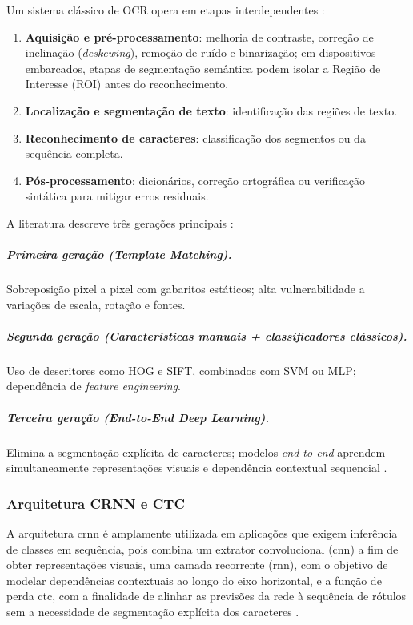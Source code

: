 Um sistema clássico de OCR opera em etapas interdependentes \cite{chen2021survey}:
\begin{enumerate}
    \item \textbf{Aquisição e pré-processamento}: melhoria de contraste, correção de inclinação (\textit{deskewing}), remoção de ruído e binarização; em dispositivos embarcados, etapas de segmentação semântica podem isolar a Região de Interesse (ROI) antes do reconhecimento.
    \item \textbf{Localização e segmentação de texto}: identificação das regiões de texto.
    \item \textbf{Reconhecimento de caracteres}: classificação dos segmentos ou da sequência completa.
    \item \textbf{Pós-processamento}: dicionários, correção ortográfica ou verificação sintática para mitigar erros residuais.
\end{enumerate}

A literatura descreve três gerações principais \cite{chen2021survey}:

\subparagraph{Primeira geração (Template Matching).}
Sobreposição pixel a pixel com gabaritos estáticos; 
alta vulnerabilidade a variações de escala, rotação e fontes.

\subparagraph{Segunda geração (Características manuais + classificadores clássicos).}
Uso de descritores como HOG e SIFT, 
combinados com SVM ou MLP; dependência de \textit{feature engineering}.

\subparagraph{Terceira geração (End-to-End Deep Learning).}
Elimina a segmentação explícita de caracteres; 
modelos \textit{end-to-end} aprendem simultaneamente representações 
visuais e dependência contextual sequencial \cite{shi2017crnn}.

\subsubsection{Arquitetura CRNN e CTC}
\label{subsubsec:crnn_ctc}

A arquitetura \gls{crnn} é amplamente utilizada em aplicações que exigem 
inferência de classes em sequência, 
pois combina um extrator convolucional (\gls{cnn}) 
a fim de obter representações visuais, 
uma camada recorrente (\gls{rnn}), com o objetivo de modelar dependências contextuais ao longo do eixo horizontal, 
e a função de perda \gls{ctc}, com a finalidade de alinhar as previsões da rede à sequência de rótulos sem a necessidade de 
segmentação explícita dos caracteres \cite{shi2017crnn}.

